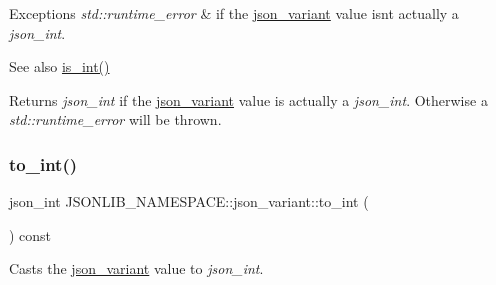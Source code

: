 \begin{DoxyExceptions}{Exceptions}
{\em std\+::runtime\+\_\+error} & if the \hyperlink{classJSONLIB__NAMESPACE_1_1json__variant}{json\+\_\+variant} value isn\textquotesingle{}t actually a {\itshape json\+\_\+int}. \\
\hline
\end{DoxyExceptions}
\begin{DoxySeeAlso}{See also}
\hyperlink{classJSONLIB__NAMESPACE_1_1json__variant_a2d6f7d2f92f5c3bfaf9c548a783a97fb}{is\+\_\+int()} 
\end{DoxySeeAlso}
\begin{DoxyReturn}{Returns}
{\itshape json\+\_\+int} if the \hyperlink{classJSONLIB__NAMESPACE_1_1json__variant}{json\+\_\+variant} value is actually a {\itshape json\+\_\+int}. Otherwise a {\itshape std\+::runtime\+\_\+error} will be thrown. 
\end{DoxyReturn}
\mbox{\label{classJSONLIB__NAMESPACE_1_1json__variant_a8f30debf624e1a9d6cdc8aed8f7bda3d}} 
\subsubsection{\texorpdfstring{to\+\_\+int()}{to\_int()}\hspace{0.1cm}{\footnotesize\ttfamily [2/2]}}
{\footnotesize\ttfamily json\+\_\+int J\+S\+O\+N\+L\+I\+B\+\_\+\+N\+A\+M\+E\+S\+P\+A\+C\+E\+::json\+\_\+variant\+::to\+\_\+int (\begin{DoxyParamCaption}{ }\end{DoxyParamCaption}) const}



Casts the \hyperlink{classJSONLIB__NAMESPACE_1_1json__variant}{json\+\_\+variant} value to {\itshape json\+\_\+int}. 


